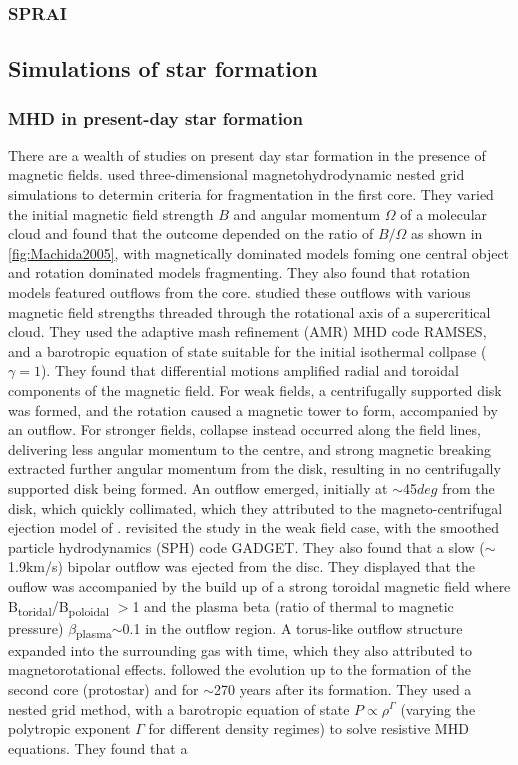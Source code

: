 \documentclass[11pt]{article}
\begin{document}
\subsubsection{SPRAI}

\subsection{Simulations of star formation}
\subsubsection{MHD in present-day star formation}
\label{sub:MHD_present}

There are a wealth of studies on present day star formation in the presence of magnetic fields. \cite{Machida2005} used three-dimensional magnetohydrodynamic nested grid simulations to determin criteria for fragmentation in the first core. They varied the initial magnetic field strength $B$ and angular momentum $\Omega$ of a molecular cloud and found that the outcome depended on the ratio of $B/\Omega$ as shown in \autoref{fig:Machida2005}, with magnetically dominated models foming one central object and rotation dominated models fragmenting. They also found that rotation models featured outflows from the core. \cite{Hennebelle2008} studied these outflows with various magnetic field strengths threaded  through the rotational axis of a supercritical cloud. They used the adaptive mash refinement (AMR) MHD code RAMSES, and a barotropic equation of state suitable for the initial isothermal collpase ($\gamma =1$). They found that differential motions amplified radial and toroidal components of the magnetic field. For weak fields, a centrifugally supported disk was formed, and the rotation caused a magnetic tower to form, accompanied by an outflow. For stronger fields, collapse instead occurred along the field lines, delivering less angular momentum to the centre, and strong magnetic breaking extracted further angular momentum from the disk, resulting in no centrifugally supported disk being formed. An outflow emerged, initially at $\sim$45$deg$ from the disk, which quickly collimated, which they attributed to the magneto-centrifugal ejection model of \cite{Blandford1982}. \cite{Burzle2011} revisited the study in the weak field case, with the smoothed particle hydrodynamics (SPH) code GADGET.  They also found that a slow ($\sim$1.9km/s) bipolar outflow was ejected from the disc. They displayed that the ouflow was accompanied by the build up of a strong toroidal magnetic field where B\textsubscript{toridal}/B\textsubscript{poloidal} $>$1 and the plasma beta (ratio of thermal to magnetic pressure) $\beta$\textsubscript{plasma}$\sim$0.1 in the outflow region. A torus-like outflow structure  expanded into the surrounding gas with time, which they also attributed to magnetorotational effects. \cite{Machida2014}  followed the evolution up to the formation of the second core (protostar) and for $\sim$270 years after its formation. They used a nested grid method, with a barotropic equation of state $P\propto\rho^{\Gamma}$ (varying the polytropic exponent $\Gamma$ for different density regimes) to solve resistive MHD equations. They found that a 
\end{document}

